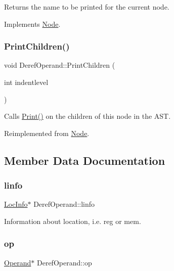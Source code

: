Returns the name to be printed for the current node. 

Implements \hyperlink{class_node_a56e29657306ffb004d69c6929ae44269}{Node}.

\mbox{\label{class_deref_operand_a64fc44093f59b87172b8a04752a13d45}} 
\subsubsection{\texorpdfstring{Print\+Children()}{PrintChildren()}}
{\footnotesize\ttfamily void Deref\+Operand\+::\+Print\+Children (\begin{DoxyParamCaption}\item[{int}]{indentlevel }\end{DoxyParamCaption})\hspace{0.3cm}{\ttfamily [virtual]}}

Calls \hyperlink{class_node_a9ef727fd72d1a37792b3db60a8a479dd}{Print()} on the children of this node in the A\+ST. 

Reimplemented from \hyperlink{class_node_a3e67ec8d22182b721717af14fe0c3000}{Node}.



\subsection{Member Data Documentation}
\mbox{\label{class_deref_operand_a62b18da9e27d9d1bda7810debb45fc66}} 
\subsubsection{\texorpdfstring{linfo}{linfo}}
{\footnotesize\ttfamily \hyperlink{class_loc_info}{Loc\+Info}$\ast$ Deref\+Operand\+::linfo\hspace{0.3cm}{\ttfamily [protected]}}

Information about location, i.\+e. reg or mem. \mbox{\label{class_deref_operand_a5999f70ee683b69541a312893d177fd8}} 
\subsubsection{\texorpdfstring{op}{op}}
{\footnotesize\ttfamily \hyperlink{class_operand}{Operand}$\ast$ Deref\+Operand\+::op\hspace{0.3cm}{\ttfamily [protected]}}

